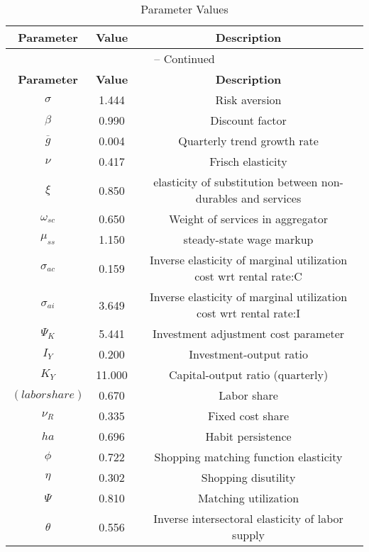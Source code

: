 \begin{center}
\begin{longtable}{ccc}
\caption{Parameter Values}\\%
\toprule%
\multicolumn{1}{c}{\textbf{Parameter}} &
\multicolumn{1}{c}{\textbf{Value}} &
 \multicolumn{1}{c}{\textbf{Description}}\\%
\midrule%
\endfirsthead
\multicolumn{3}{c}{{\tablename} \thetable{} -- Continued}\\%
\midrule%
\multicolumn{1}{c}{\textbf{Parameter}} &
\multicolumn{1}{c}{\textbf{Value}} &
  \multicolumn{1}{c}{\textbf{Description}}\\%
\midrule%
\endhead
${\sigma}$ 	 & 	 1.444 	 & 	 Risk aversion\\
${\beta}$ 	 & 	 0.990 	 & 	 Discount factor\\
${\overline{g}}$ 	 & 	 0.004 	 & 	 Quarterly trend growth rate\\
$\nu$ 	 & 	 0.417 	 & 	 Frisch elasticity\\
$\xi$ 	 & 	 0.850 	 & 	 elasticity of substitution between non-durables and services\\
$\omega_{sc}$ 	 & 	 0.650 	 & 	 Weight of services in aggregator\\
$\mu_{ss}$ 	 & 	 1.150 	 & 	 steady-state wage markup\\
${\sigma_{ac}}$ 	 & 	 0.159 	 & 	 Inverse elasticity of marginal utilization cost wrt rental rate:C\\
${\sigma_{ai}}$ 	 & 	 3.649 	 & 	 Inverse elasticity of marginal utilization cost wrt rental rate:I\\
${\Psi_{K}}$ 	 & 	 5.441 	 & 	 Investment adjustment cost parameter\\
${I_Y}$ 	 & 	 0.200 	 & 	 Investment-output ratio\\
${K_Y}$ 	 & 	 11.000 	 & 	 Capital-output ratio (quarterly)\\
$(labor share)$ 	 & 	 0.670 	 & 	 Labor share\\
${\nu_R}$ 	 & 	 0.335 	 & 	 Fixed cost share\\
${ha}$ 	 & 	 0.696 	 & 	 Habit persistence\\
${\phi}$ 	 & 	 0.722 	 & 	 Shopping matching function elasticity\\
${\eta}$ 	 & 	 0.302 	 & 	 Shopping disutility\\
${\Psi}$ 	 & 	 0.810 	 & 	 Matching utilization\\
${\theta}$ 	 & 	 0.556 	 & 	 Inverse intersectoral elasticity of labor supply\\

\end{longtable}
\end{center}
